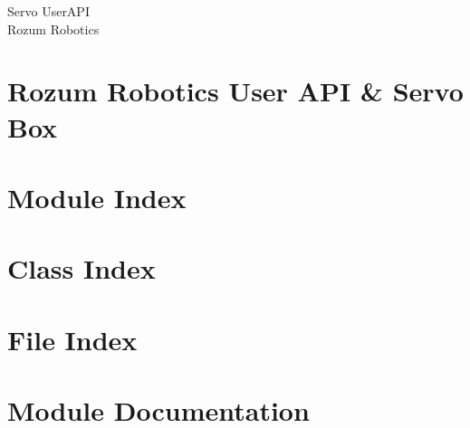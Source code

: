 \documentclass[twoside]{book}
\newcommand{\+}{\discretionary{\mbox{\scriptsize$\hookleftarrow$}}{}{}}
\newcommand{\clearemptydoublepage}{%
  \newpage{\pagestyle{empty}\cleardoublepage}%
}
\begin{document}
\hypersetup{pageanchor=false,
             bookmarksnumbered=true,
             pdfencoding=unicode
            }
\begin{titlepage}
\vspace*{7cm}
\begin{center}%
{\Large Servo UserAPI}\\
\vspace*{1cm}
{\large Rozum Robotics}\\
\end{center}
\end{titlepage}
\clearemptydoublepage
{}
\tableofcontents
\clearemptydoublepage
{}
\hypersetup{pageanchor=true}

\chapter{Rozum Robotics User API \& Servo Box}
\label{index}\hypertarget{index}{}
\chapter{Module Index}

\chapter{Class Index}

\chapter{File Index}

\chapter{Module Documentation}




























\end{document}
